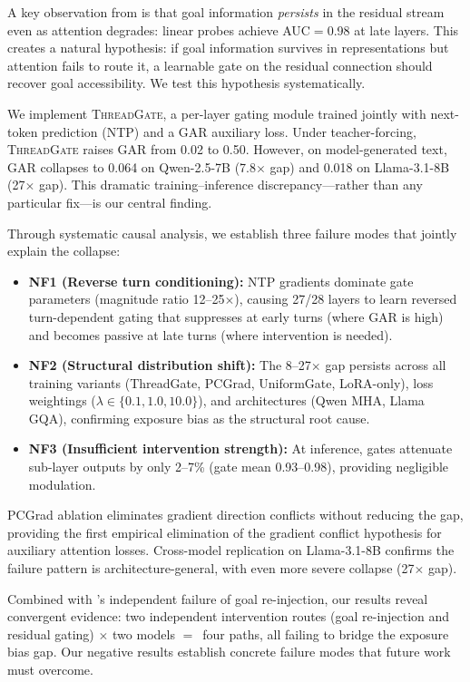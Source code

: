 \documentclass[11pt]{article}
\newcommand{\gar}{\textsc{GAR}}
\newcommand{\tg}{\textsc{ThreadGate}}
\begin{document}
A key observation from \citet{dongre2026goal} is that goal information \emph{persists} in the residual stream even as attention degrades: linear probes achieve AUC$=$0.98 at late layers. This creates a natural hypothesis: if goal information survives in representations but attention fails to route it, a learnable gate on the residual connection should recover goal accessibility. We test this hypothesis systematically.

We implement \tg{}, a per-layer gating module trained jointly with next-token prediction (NTP) and a \gar{} auxiliary loss. Under teacher-forcing, \tg{} raises \gar{} from 0.02 to 0.50. However, on model-generated text, \gar{} collapses to 0.064 on Qwen-2.5-7B (7.8$\times$ gap) and 0.018 on Llama-3.1-8B (27$\times$ gap). This dramatic training--inference discrepancy---rather than any particular fix---is our central finding.

Through systematic causal analysis, we establish three failure modes that jointly explain the collapse:
\begin{itemize}
    \item \textbf{NF1 (Reverse turn conditioning):} NTP gradients dominate gate parameters (magnitude ratio 12--25$\times$), causing 27/28 layers to learn reversed turn-dependent gating that suppresses at early turns (where \gar{} is high) and becomes passive at late turns (where intervention is needed).
    \item \textbf{NF2 (Structural distribution shift):} The 8--27$\times$ gap persists across all training variants (ThreadGate, PCGrad, UniformGate, LoRA-only), loss weightings ($\lambda \in \{0.1, 1.0, 10.0\}$), and architectures (Qwen MHA, Llama GQA), confirming exposure bias as the structural root cause.
    \item \textbf{NF3 (Insufficient intervention strength):} At inference, gates attenuate sub-layer outputs by only 2--7\% (gate mean 0.93--0.98), providing negligible modulation.
\end{itemize}

PCGrad ablation \citep{yu2020gradient} eliminates gradient direction conflicts without reducing the gap, providing the first empirical elimination of the gradient conflict hypothesis for auxiliary attention losses. Cross-model replication on Llama-3.1-8B confirms the failure pattern is architecture-general, with even more severe collapse (27$\times$ gap).

Combined with \citet{dongre2026goal}'s independent failure of goal re-injection, our results reveal convergent evidence: two independent intervention routes (goal re-injection and residual gating) $\times$ two models $=$~four paths, all failing to bridge the exposure bias gap. Our negative results establish concrete failure modes that future work must overcome.
\end{document}

